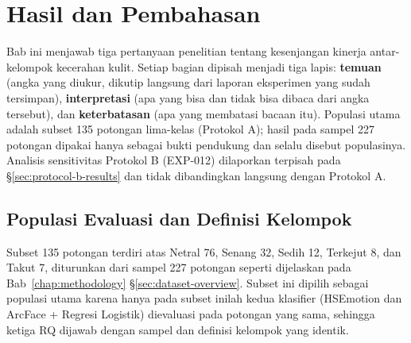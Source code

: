 \chapter{Hasil dan Pembahasan}
\label{chap:results}

Bab ini menjawab tiga pertanyaan penelitian tentang kesenjangan kinerja antar-kelompok kecerahan kulit. Setiap bagian dipisah menjadi tiga lapis: \textbf{temuan} (angka yang diukur, dikutip langsung dari laporan eksperimen yang sudah tersimpan), \textbf{interpretasi} (apa yang bisa dan tidak bisa dibaca dari angka tersebut), dan \textbf{keterbatasan} (apa yang membatasi bacaan itu). Populasi utama adalah subset 135 potongan lima-kelas (Protokol A); hasil pada sampel 227 potongan dipakai hanya sebagai bukti pendukung dan selalu disebut populasinya. Analisis sensitivitas Protokol B (EXP-012) dilaporkan terpisah pada \S\ref{sec:protocol-b-results} dan tidak dibandingkan langsung dengan Protokol A.

\section{Populasi Evaluasi dan Definisi Kelompok}
\label{sec:results-setup}

Subset 135 potongan terdiri atas Netral 76, Senang 32, Sedih 12, Terkejut 8, dan Takut 7, diturunkan dari sampel 227 potongan seperti dijelaskan pada Bab~\ref{chap:methodology} \S\ref{sec:dataset-overview}. Subset ini dipilih sebagai populasi utama karena hanya pada subset inilah kedua klasifier (HSEmotion dan ArcFace + Regresi Logistik) dievaluasi pada potongan yang sama, sehingga ketiga RQ dijawab dengan sampel dan definisi kelompok yang identik.

